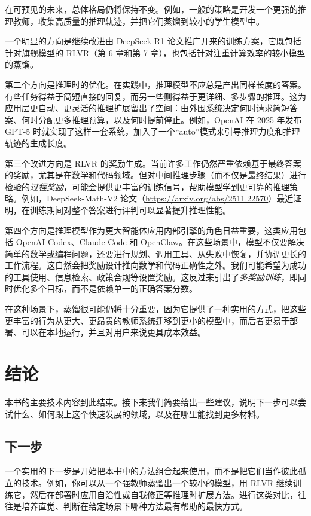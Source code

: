 在可预见的未来，总体格局仍将保持不变。例如，一般的策略是开发一个更强的推理教师，收集高质量的推理轨迹，并把它们蒸馏到较小的学生模型中。

一个明显的方向是继续改进由 DeepSeek-R1 论文推广开来的训练方案，它既包括针对旗舰模型的 RLVR（第 6 章和第 7 章），也包括针对注重计算效率的较小模型的蒸馏。

第二个方向是推理时的优化。在实践中，推理模型不应总是产出同样长度的答案。有些任务得益于简短直接的回复，而另一些则得益于更详细、多步骤的推理。这为应用层更自动、更灵活的推理扩展留出了空间：由外围系统决定何时请求简短答案、何时分配更多推理预算，以及何时提前停止。例如，OpenAI 在 2025 年发布 GPT-5 时就实现了这样一套系统，加入了一个“auto”模式来引导推理力度和推理轨迹的生成长度。

第三个改进方向是 RLVR 的奖励生成。当前许多工作仍然严重依赖基于最终答案的奖励，尤其是在数学和代码领域。但对中间推理步骤（而不仅是最终结果）进行检验的\emph{过程奖励}，可能会提供更丰富的训练信号，帮助模型学到更可靠的推理策略。例如，DeepSeek-Math-V2 论文（\href{https://arxiv.org/abs/2511.22570}{https://arxiv.org/abs/2511.22570}）最近证明，在训练期间对整个答案进行评判可以显著提升推理性能。

第四个方向是推理模型作为更大智能体应用内部引擎的角色日益重要，这类应用包括 OpenAI Codex、Claude Code 和 OpenClaw。在这些场景中，模型不仅要解决简单的数学或编程问题，还要进行规划、调用工具、从失败中恢复，并协调更长的工作流程。这自然会把奖励设计推向数学和代码正确性之外。我们可能希望为成功的工具使用、信息检索、政策合规等设置奖励。这反过来引出了\emph{多奖励训练}，即同时优化多个目标，而不是依赖单一的正确答案分数。

在这种场景下，蒸馏很可能仍将十分重要，因为它提供了一种实用的方式，把这些更丰富的行为从更大、更昂贵的教师系统迁移到更小的模型中，而后者更易于部署、可以在本地运行，并且对用户来说更具成本效益。

\section{结论}

本书的主要技术内容到此结束。接下来我们简要给出一些建议，说明下一步可以尝试什么、如何跟上这个快速发展的领域，以及在哪里能找到更多材料。

\subsection{下一步}

一个实用的下一步是开始把本书中的方法组合起来使用，而不是把它们当作彼此孤立的技术。例如，你可以从一个强教师蒸馏出一个较小的模型，用 RLVR 继续训练它，然后在部署时应用自洽性或自我修正等推理时扩展方法。进行这类对比，往往是培养直觉、判断在给定场景下哪种方法最有帮助的最快方式。

